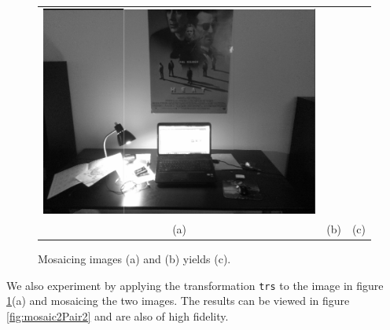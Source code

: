 \documentclass[11pt]{article} %
\begin{document}
\begin{figure}[H]
\begin{tabular}{ccc}
			\includegraphics[scale=.20]{figures/room_mosaic} \\ 
		(a) & (b) & (c)
	\end{tabular}
	\caption{Mosaicing images (a) and (b) yields (c).}
	\label{fig:mosaicPair2}
\end{figure}

We also experiment by applying the transformation \texttt{trs} to the image in figure \ref{fig:mosaicPair2}(a) and mosaicing the two images. The results can be viewed in figure \ref{fig:mosaic2Pair2} and are also of high fidelity.
\end{document}
